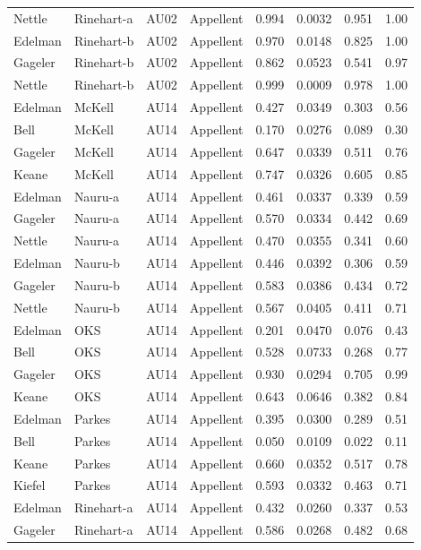 \documentclass{monashthesis}
\begin{document}
\begin{center}
\begin{longtable}{llllllll}
Nettle & Rinehart-a & AU02 & Appellent & 0.994 & 0.0032 & 0.951 & 1.00 \\
Edelman & Rinehart-b & AU02 & Appellent & 0.970 & 0.0148 & 0.825 & 1.00 \\
Gageler & Rinehart-b & AU02 & Appellent & 0.862 & 0.0523 & 0.541 & 0.97 \\
Nettle & Rinehart-b & AU02 & Appellent & 0.999 & 0.0009 & 0.978 & 1.00 \\
Edelman & McKell & AU14 & Appellent & 0.427 & 0.0349 & 0.303 & 0.56 \\
Bell & McKell & AU14 & Appellent & 0.170 & 0.0276 & 0.089 & 0.30 \\
Gageler & McKell & AU14 & Appellent & 0.647 & 0.0339 & 0.511 & 0.76 \\
Keane & McKell & AU14 & Appellent & 0.747 & 0.0326 & 0.605 & 0.85 \\
Edelman & Nauru-a & AU14 & Appellent & 0.461 & 0.0337 & 0.339 & 0.59 \\
Gageler & Nauru-a & AU14 & Appellent & 0.570 & 0.0334 & 0.442 & 0.69 \\
Nettle & Nauru-a & AU14 & Appellent & 0.470 & 0.0355 & 0.341 & 0.60 \\
Edelman & Nauru-b & AU14 & Appellent & 0.446 & 0.0392 & 0.306 & 0.59 \\
Gageler & Nauru-b & AU14 & Appellent & 0.583 & 0.0386 & 0.434 & 0.72 \\
Nettle & Nauru-b & AU14 & Appellent & 0.567 & 0.0405 & 0.411 & 0.71 \\
Edelman & OKS & AU14 & Appellent & 0.201 & 0.0470 & 0.076 & 0.43 \\
Bell & OKS & AU14 & Appellent & 0.528 & 0.0733 & 0.268 & 0.77 \\
Gageler & OKS & AU14 & Appellent & 0.930 & 0.0294 & 0.705 & 0.99 \\
Keane & OKS & AU14 & Appellent & 0.643 & 0.0646 & 0.382 & 0.84 \\
Edelman & Parkes & AU14 & Appellent & 0.395 & 0.0300 & 0.289 & 0.51 \\
Bell & Parkes & AU14 & Appellent & 0.050 & 0.0109 & 0.022 & 0.11 \\
Keane & Parkes & AU14 & Appellent & 0.660 & 0.0352 & 0.517 & 0.78 \\
Kiefel & Parkes & AU14 & Appellent & 0.593 & 0.0332 & 0.463 & 0.71 \\
Edelman & Rinehart-a & AU14 & Appellent & 0.432 & 0.0260 & 0.337 & 0.53 \\
Gageler & Rinehart-a & AU14 & Appellent & 0.586 & 0.0268 & 0.482 & 0.68 \\

\end{longtable}
\end{center}
\end{document}
